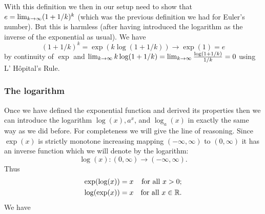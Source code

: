 \documentclass[10pt, a4paper]{article}
\newcommand{\lhopital}[0]{L' H\^opital}
\begin{document}
\begin{remark}
    With this definition we then in our setup need to show that $e = \liminfty[k](1 + 1 / k) ^ k$
    (which was the previous definition we had for Euler's number).
    But this is harmless
    (after having introduced the logarithm as the inverse of the exponential as usual).
    We have
    \[
    (1 + 1 / k) ^ k = \exp(k\log(1 + 1 / k)) \rightarrow \exp(1) = e
    \]
    by continuity of $\exp$ and $\liminfty[k]k\log(1 + 1 / k) = \liminfty[k]\frac{\log(1 + 1 / k)}{1 / k} = 0$ using \lhopital's Rule.
\end{remark}

\subsubsection{The logarithm}
Once we have defined the exponential function and derived its properties then we can introduce the logarithm $\log(x), a ^ x$,
and $\log_a(x)$ in exactly the same way as we did before.
For completeness we will give the line of reasoning.
Since $\exp(x)$ is strictly monotone increasing mapping $(-\infty, \infty)$ to $(0, \infty)$ it has an inverse function which we will denote by the logarithm:
\[
\log(x) : (0, \infty) \rightarrow (-\infty, \infty).
\]
Thus
\begin{align*}
    \exp(\log(x)) &= x&\text{for all } x > 0; \\
    \log(\exp(x)) &= x&\text{for all } x \in \R.
\end{align*}
We have
\end{document}
